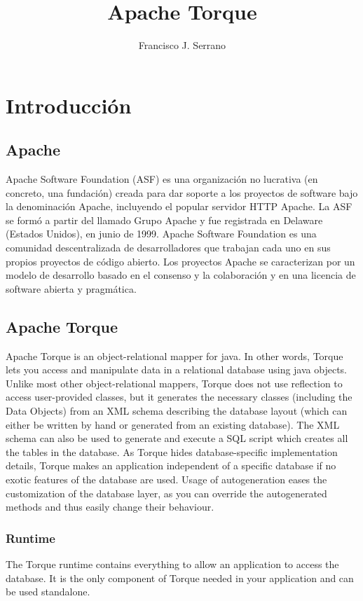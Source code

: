 \documentclass[12pt, oneside]{article}
\title{Apache Torque}
\author{Francisco J. Serrano}
\begin{document}
\maketitle
\tableofcontents

\section{Introducción}

\subsection{Apache}
Apache Software Foundation (ASF) es una organización no lucrativa (en concreto, una fundación) creada para dar soporte a los proyectos de software bajo la denominación Apache, incluyendo el popular servidor HTTP Apache. La ASF se formó a partir del llamado Grupo Apache y fue registrada en Delaware (Estados Unidos), en junio de 1999.
Apache Software Foundation es una comunidad descentralizada de desarrolladores que trabajan cada uno en sus propios proyectos de código abierto. Los proyectos Apache se caracterizan por un modelo de desarrollo basado en el consenso y la colaboración y en una licencia de software abierta y pragmática.

\subsection{Apache Torque}
Apache Torque is an object-relational mapper for java. In other words, Torque lets you access and manipulate data in a relational database using java objects. Unlike most other object-relational mappers, Torque does not use reflection to access user-provided classes, but it generates the necessary classes (including the Data Objects) from an XML schema describing the database layout (which can either be written by hand or generated from an existing database). The XML schema can also be used to generate and execute a SQL script which creates all the tables in the database.
As Torque hides database-specific implementation details, Torque makes an application independent of a specific database if no exotic features of the database are used.
Usage of autogeneration eases the customization of the database layer, as you can override the autogenerated methods and thus easily change their behaviour.

\subsubsection{Runtime}
The Torque runtime contains everything to allow an application to access the database. It is the only component of Torque needed in your application and can be used standalone.
\end{document}
